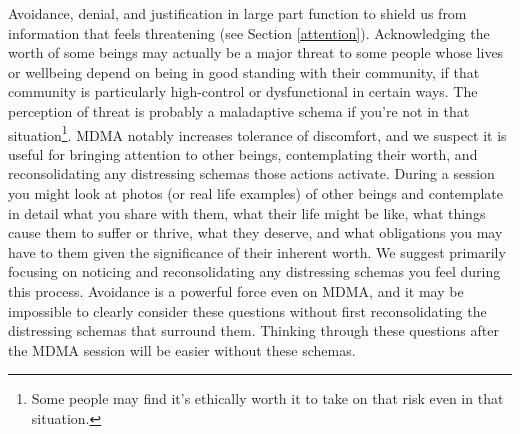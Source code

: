 \documentclass[12pt,letterpaper]{book}
\begin{document}
Avoidance, denial, and justification in large part function to shield us from information that feels threatening (see Section \ref{attention}). Acknowledging the worth of some beings may actually be a major threat to some people whose lives or wellbeing depend on being in good standing with their community, if that community is particularly high-control or dysfunctional in certain ways. The perception of threat is probably a maladaptive schema if you're not in that situation\footnote{Some people may find it's ethically worth it to take on that risk even in that situation.}. MDMA notably increases tolerance of discomfort, and we suspect it is useful for bringing attention to other beings, contemplating their worth, and reconsolidating any distressing schemas those actions activate. During a session you might look at photos (or real life examples) of other beings and contemplate in detail what you share with them, what their life might be like, what things cause them to suffer or thrive, what they deserve, and what obligations you may have to them given the significance of their inherent worth. We suggest primarily focusing on noticing and reconsolidating any distressing schemas you feel during this process. Avoidance is a powerful force even on MDMA, and it may be impossible to clearly consider these questions without first reconsolidating the distressing schemas that surround them. Thinking through these questions after the MDMA session will be easier without these schemas.
\end{document}

